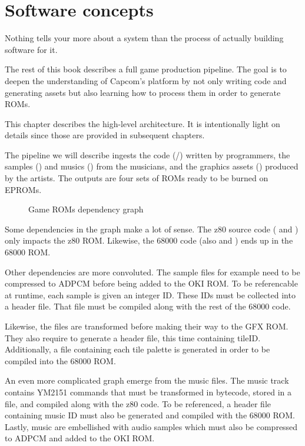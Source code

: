 \chapter{Software concepts}

Nothing tells your more about a system than the process of actually building software for it.

The rest of this book describes a full game production pipeline. The goal is to deepen the understanding of Capcom's platform by not only writing code and generating assets but also learning how to process them in order to generate ROMs.

This chapter describes the high-level architecture. It is intentionally light on details since those are provided in subsequent chapters.

The pipeline we will describe ingests the code (/) written by programmers, the samples () and musics () from the musicians, and the graphics assets () produced by the artists. The outputs are four sets of ROMs ready to be burned on EPROMs. 

 \begin{figure}[H]
\caption*{Game ROMs dependency graph}
\end{figure}

\pagebreak
Some dependencies in the graph make a lot of sense. The z80 source code ( and ) only impacts the z80 ROM. Likewise, the 68000 code (also  and ) ends up in the 68000 ROM.

Other dependencies are more convoluted. The  sample files for example need to be compressed to ADPCM before being added to the OKI ROM. To be referencable at runtime, each sample is given an integer ID. These IDs must be collected into a  header file. That file must be compiled along with the rest of the 68000 code.

Likewise, the  files are transformed before making their way to the GFX ROM. They also require to generate a  header file, this time containing tileID. Additionally, a  file containing each tile palette is generated in order to be compiled into the 68000 ROM. 

An even more complicated graph emerge from the music  files. The music track contains YM2151 commands that must be transformed in bytecode, stored in a  file, and compiled along with the z80 code. To be referenced, a header file containing music ID must also be generated and compiled with the 68000 ROM. Lastly, music are embellished with audio samples which must also be compressed to ADPCM and added to the OKI ROM.

